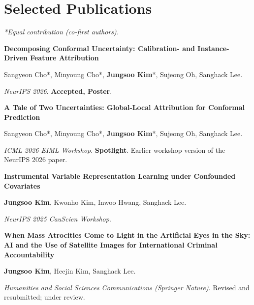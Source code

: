 \documentclass[a4paper,10pt]{article}
\begin{document}
\section{Selected Publications}
{\small\textit{*Equal contribution (co-first authors).}}\par
\textbf{Decomposing Conformal Uncertainty: Calibration- and Instance-Driven Feature Attribution}\par
Sangyeon Cho*, Minyoung Cho*, \textbf{Jungsoo Kim}*, Sujeong Oh, Sanghack Lee.\par
\textit{NeurIPS 2026}. \textbf{Accepted, Poster}.\par
\vspace{3pt}
\textbf{A Tale of Two Uncertainties: Global-Local Attribution for Conformal Prediction}\par
Sangyeon Cho*, Minyoung Cho*, \textbf{Jungsoo Kim}*, Sujeong Oh, Sanghack Lee.\par
\textit{ICML 2026 EIML Workshop}. \textbf{Spotlight}. Earlier workshop version of the NeurIPS 2026 paper.\par
\vspace{3pt}
\textbf{Instrumental Variable Representation Learning under Confounded Covariates}\par
\textbf{Jungsoo Kim}, Kwonho Kim, Inwoo Hwang, Sanghack Lee.\par
\textit{NeurIPS 2025 CauScien Workshop}.\par
\vspace{3pt}
\textbf{When Mass Atrocities Come to Light in the Artificial Eyes in the Sky: AI and the Use of Satellite Images for International Criminal Accountability}\par
\textbf{Jungsoo Kim}, Heejin Kim, Sanghack Lee.\par
\textit{Humanities and Social Sciences Communications (Springer Nature)}. Revised and resubmitted; under review.\par
\vspace{3pt}
\end{document}
